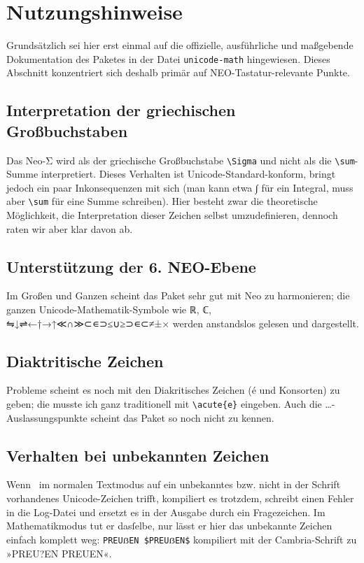 ﻿\documentclass{scrartcl}
\begin{document}
\section{Nutzungshinweise}
Grundsätzlich sei hier erst einmal auf die offizielle, ausführliche und maßgebende Dokumentation des Paketes in der Datei \verb|unicode-math| hingewiesen. Dieses Abschnitt konzentriert sich deshalb primär auf NEO-Tastatur-relevante Punkte.

\subsection{Interpretation der griechischen Großbuchstaben}
Das Neo-Σ wird als der griechische Großbuchstabe \verb|\Sigma| und nicht als die \verb|\sum|-Summe interpretiert. Dieses Verhalten ist Unicode-Standard-konform, bringt jedoch ein paar Inkonsequenzen mit sich (man kann etwa ∫ für ein Integral, muss aber \verb|\sum| für eine Summe schreiben). Hier besteht zwar die theoretische Möglichkeit, die Interpretation dieser Zeichen selbst umzudefinieren, dennoch raten wir aber klar davon ab.

\subsection{Unterstützung der 6. NEO-Ebene}
Im Großen und Ganzen scheint das Paket sehr gut mit Neo zu harmonieren; die ganzen Unicode-Mathematik-Symbole wie ℝ, ℂ, ⇋↓⇌←†→↑≪∩≫⊂∊⊃≤∪≥⊃∊⊂≠±× werden anstandslos gelesen und dargestellt.

\subsection{Diaktritische Zeichen}
Probleme scheint es noch mit den Diakritisches Zeichen (é und Konsorten) zu geben; die musste ich ganz traditionell mit \verb|\acute{e}| eingeben. Auch die …-Auslassungspunkte scheint das Paket so noch nicht zu kennen.

\subsection{Verhalten bei unbekannten Zeichen}
Wenn \XeTeX\ im normalen Textmodus auf ein unbekanntes bzw. nicht in der Schrift vorhandenes Unicode-Zeichen trifft, kompiliert es trotzdem, schreibt einen Fehler in die Log-Datei und ersetzt es in der Ausgabe durch ein Fragezeichen. Im Mathematikmodus tut er dasſelbe, nur lässt er hier das unbekannte Zeichen einfach komplett weg: \verb|PREUẞEN $PREUẞEN$| kompiliert mit der Cambria-Schrift zu »PREU?EN PREUEN«.
\end{document}
